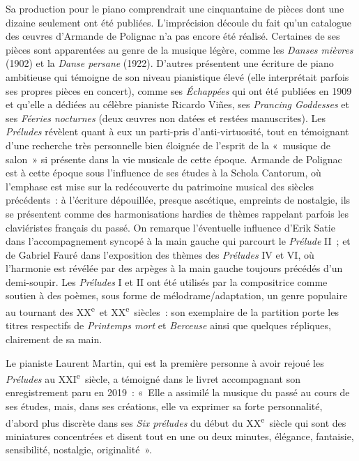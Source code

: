 \documentclass[a4paper, 12pt]{book}
\begin{document}
Sa production pour le piano comprendrait une cinquantaine de pièces dont
une dizaine seulement ont été publiées. L'imprécision découle du fait
qu'un catalogue des œuvres
d'Armande de Polignac n'a pas encore été réalisé. Certaines de ses
pièces sont apparentées au genre de la musique légère, comme les
\emph{Danses mièvres} (1902) et la \emph{Danse persane} (1922). D'autres
présentent une écriture de piano ambitieuse qui témoigne de son niveau
pianistique élevé (elle interprétait parfois ses propres pièces en
concert), comme ses \emph{Échappées} qui ont été publiées en 1909 et
qu'elle a dédiées au célèbre pianiste Ricardo Viñes, ses \emph{Prancing
Goddesses} et ses \emph{Féeries nocturnes} (deux œuvres non datées et
restées manuscrites). Les \emph{Préludes} révèlent quant à eux un
parti-pris d'anti-virtuosité, tout en témoignant d'une recherche très
personnelle bien éloignée de l'esprit de la «~musique de salon~» si
présente dans la vie musicale de cette époque. Armande de Polignac est à
cette époque sous l'influence de ses études à la Schola Cantorum, où
l'emphase est mise sur la redécouverte du patrimoine musical des siècles
précédents~: à l'écriture dépouillée, presque ascétique, empreints de
nostalgie, ils se présentent comme des harmonisations hardies de thèmes
rappelant parfois les claviéristes français du passé. On remarque
l'éventuelle influence d'Erik Satie dans l'accompagnement syncopé à la
main gauche qui parcourt le \emph{Prélude} II~; et de Gabriel Fauré dans
l'exposition des thèmes des \emph{Préludes} IV et VI, où l'harmonie est
révélée par des arpèges à la main gauche toujours précédés d'un
demi-soupir. Les \emph{Préludes} I et II ont été utilisés par la
compositrice comme soutien à des poèmes, sous forme de
mélodrame/adaptation, un genre populaire au tournant des
XX\textsuperscript{e}~et XX\textsuperscript{e}~siècles~: son exemplaire
de la partition porte les titres respectifs de \emph{Printemps mort} et
\emph{Berceuse} ainsi que quelques répliques, clairement de sa main.

Le pianiste Laurent Martin, qui est la première personne à avoir rejoué
les \emph{Préludes} au XXI\textsuperscript{e}~siècle, a témoigné dans le
livret accompagnant son enregistrement paru en 2019~: «~Elle a assimilé
la musique du passé au cours de ses études, mais, dans ses créations,
elle va exprimer sa forte personnalité, d'abord plus discrète dans ses
\emph{Six préludes} du début du XX\textsuperscript{e}~siècle qui sont
des miniatures concentrées et disent tout en une ou deux minutes,
élégance, fantaisie, sensibilité, nostalgie, originalité~».
\end{document}
